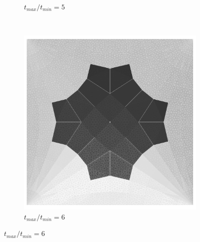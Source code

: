 \begin{figure}[H]
\begin{subfigure}[b]{.32\textwidth}
  \caption{$t_{max}/t_{min}=5$}
\end{subfigure}
~
\begin{subfigure}[b]{.32\textwidth}
  \centering
  \includegraphics[width=.99\linewidth]{images/t_opt_l2d10_gamma6}
  \caption{$t_{max}/t_{min}=6$}
\end{subfigure}


\end{figure}
